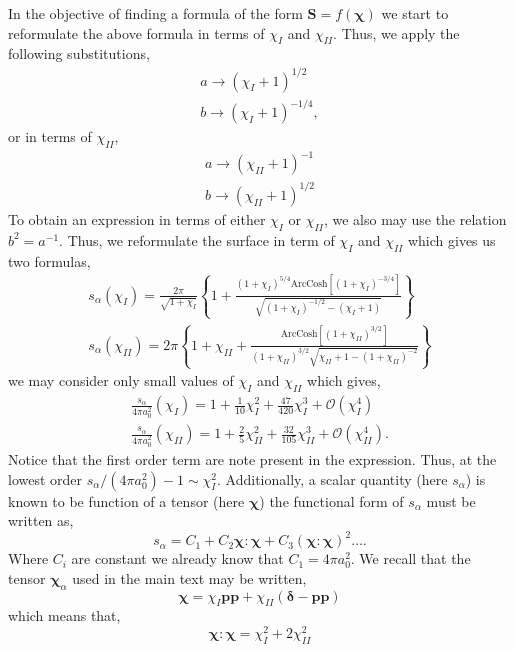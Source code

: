 In the objective of finding a formula of the form $\textbf{S} = f(\bm\chi)$ we start to reformulate the above formula in terms of $\chi_I$ and $\chi_{II}$. 
Thus, we apply the following substitutions, 
\begin{align*}
    a \to (\chi_I +1)^{1/2}\\
    b \to (\chi_I+1)^{-1/4},
\end{align*}
or in terms of $\chi_{II}$, 
\begin{align*}
    a \to (\chi_{II} +1)^{-1}\\
    b \to (\chi_{II}+1)^{1/2} 
\end{align*}
To obtain an expression in terms of either $\chi_I$ or $\chi_{II}$, 
we also may use the relation $b^2 = a^{-1}$. 
Thus, we reformulate the surface in term of $\chi_I$ and $\chi_{II}$ which gives us two formulas, 
\begin{align*}
    s_\alpha(\chi_I)
    = \frac{2\pi}{\sqrt{1+ \chi_I}}\left\{
        1 + \frac{(1+\chi_I)^{5/4} \text{ArcCosh}[(1+\chi_I)^{-3/4}]}{\sqrt{(1+\chi_I)^{-1/2}-(\chi_I+1)}}
    \right\}\\
    s_\alpha(\chi_{II})
    = 2\pi
    \left\{
        1 +\chi_{II} 
        + \frac{
            \text{ArcCosh}[(1+\chi_{II})^{3/2}]
            }{
                (1+\chi_{II})^{3/2}
                \sqrt{\chi_{II}+1- (1+\chi_{II})^{-2}}
                }
    \right\}
\end{align*}
we may consider only small values of $\chi_I$ and $\chi_{II}$ which gives,
\begin{align*}
    \frac{s_\alpha}{4\pi a_0^2}(\chi_I)
    = 
    1  
    + \frac{1}{10}\chi_I^2 
    + \frac{47}{420}\chi_I^3 
    + \mathcal{O}(\chi_I^4)\\ 
    \frac{s_\alpha}{4\pi a_0^2}(\chi_{II})
    = 
    1  
    + \frac{2}{5}\chi_{II}^2 
    + \frac{32}{105}\chi_{II}^3 
    + \mathcal{O}(\chi_{II}^4). 
\end{align*}
Notice that the first order term are note present in the expression. 
Thus, at the lowest order $s_\alpha/(4\pi a_0^2) - 1 \sim  \chi_I^2$. 
Additionally, a scalar quantity (here $s_\alpha$) is known to be function of a tensor (here $\bm\chi$) the functional form of $s_\alpha$ must be written as, 
\begin{equation*}
    s_\alpha 
    =C_1 + C_2 \bm\chi:\bm\chi + C_3  (\bm\chi:\bm\chi)^2 \ldots.
\end{equation*}
Where $C_i$ are constant we already know that $C_1 = 4\pi a_0^2$. 
We recall that the tensor $\bm\chi_\alpha$ used in the main text may be written, 
\begin{equation*}
    \bm\chi = \chi_I \textbf{pp} + \chi_{II}(\bm\delta - \textbf{pp})
\end{equation*}
which means that, 
\begin{equation*}
    \bm\chi : \bm\chi 
    = 
    \chi_I^2 
    + 
    2 \chi_{II}^2
\end{equation*}

